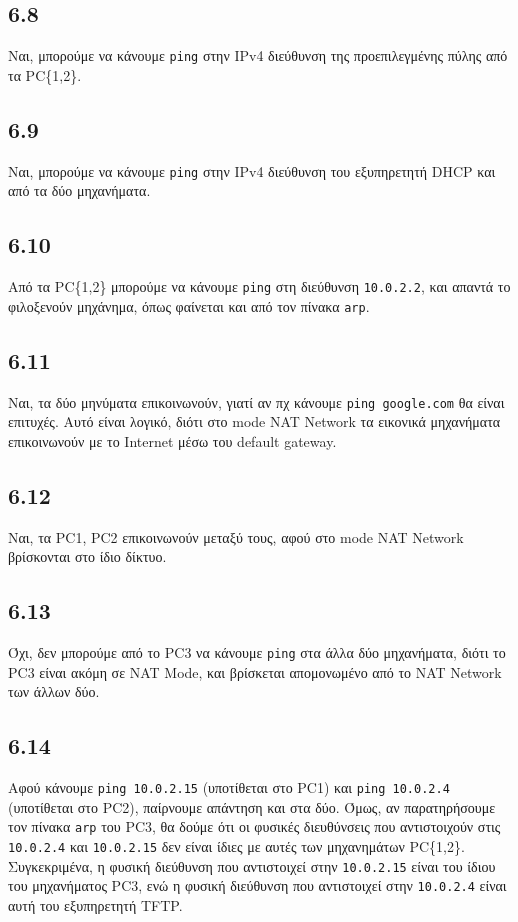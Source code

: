 \documentclass[a4paper, 12pt]{article}
\begin{document}
	\subsection*{6.8}
		Ναι, μπορούμε να κάνουμε \verb|ping| στην IPv4 διεύθυνση της προεπιλεγμένης πύλης από τα PC\{1,2\}.

	\subsection*{6.9}
		Ναι, μπορούμε να κάνουμε \verb|ping| στην IPv4 διεύθυνση του εξυπηρετητή DHCP και από τα δύο μηχανήματα.

	\subsection*{6.10}
		Από τα PC\{1,2\} μπορούμε να κάνουμε \verb|ping| στη διεύθυνση \verb|10.0.2.2|, και απαντά το φιλοξενούν μηχάνημα, όπως φαίνεται και από τον πίνακα \verb|arp|.

	\subsection*{6.11}
		Ναι, τα δύο μηνύματα επικοινωνούν, γιατί αν πχ κάνουμε \verb|ping google.com| θα είναι επιτυχές. Αυτό είναι λογικό, διότι στο mode NAT Network τα εικονικά μηχανήματα επικοινωνούν με το Internet μέσω του default gateway.

	\subsection*{6.12}
		Ναι, τα PC1, PC2 επικοινωνούν μεταξύ τους, αφού στο mode NAT Network βρίσκονται στο ίδιο δίκτυο.

	\subsection*{6.13}
		Όχι, δεν μπορούμε από το PC3 να κάνουμε \verb|ping| στα άλλα δύο μηχανήματα, διότι το PC3 είναι ακόμη σε NAT Mode, και βρίσκεται απομονωμένο από το NAT Network των άλλων δύο.

	\subsection*{6.14}
		Αφού κάνουμε \verb|ping 10.0.2.15| (υποτίθεται στο PC1) και \verb|ping 10.0.2.4| (υποτίθεται στο PC2), παίρνουμε απάντηση και στα δύο. Όμως, αν παρατηρήσουμε τον πίνακα \verb|arp| του PC3, θα δούμε ότι οι φυσικές διευθύνσεις που αντιστοιχούν στις \verb|10.0.2.4| και \verb|10.0.2.15| δεν είναι ίδιες με αυτές των μηχανημάτων PC\{1,2\}. Συγκεκριμένα, η φυσική διεύθυνση που αντιστοιχεί στην \verb|10.0.2.15| είναι του ίδιου του μηχανήματος PC3, ενώ η φυσική διεύθυνση που αντιστοιχεί στην \verb|10.0.2.4| είναι αυτή του εξυπηρετητή TFTP.
\end{document}
